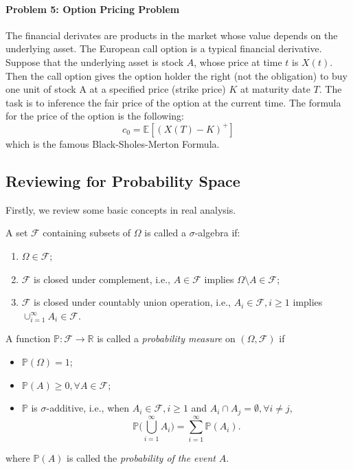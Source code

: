 
\paragraph{Problem 5: Option Pricing Problem}
The financial derivates are products in the market whose value depends on the underlying asset.
The European call option is a typical financial derivative.
Suppose that the underlying asset is stock $A$, whose price at time $t$ is $X(t)$.
Then the call option gives the option holder the right (not the obligation) to buy one unit of stock A at a specified price (strike price) $K$ at maturity date $T$.
The task is to inference the fair price of the option at the current time.
The formula for the price of the option is the following:
\[
c_0 = \mathbb{E}[
(X(T) - K)^+
]
\]
which is the famous Black-Sholes-Merton Formula.


\subsection{Reviewing for Probability Space}
Firstly, we review some basic concepts in real analysis.
\begin{definition}
A set $\mathcal{F}$ containing subsets of $\Omega$ is called a $\sigma$-algebra if:
\begin{enumerate}
\item
$\Omega\in\mathcal{F}$;
\item
$\mathcal{F}$ is closed under complement, i.e., 
$A\in\mathcal{F}$ implies $\Omega\setminus A\in\mathcal{F}$;
\item
$\mathcal{F}$ is closed under countably union operation, i.e.,
$A_i\in\mathcal{F},i\ge1$ implies $\cup_{i=1}^\infty A_i\in\mathcal{F}$.
\end{enumerate}
\end{definition}

\begin{definition}
A function $\mathbb{P}:\mathcal{F}\to\mathbb{R}$ is called a \emph{probability measure} on $(\Omega,\mathcal{F})$ if
\begin{itemize}
\item
$\mathbb{P}(\Omega)=1$;
\item
$\mathbb{P}(A)\ge0,\forall A\in\mathcal{F}$;
\item
$\mathbb{P}$ is $\sigma$-additive, i.e., when $A_i\in\mathcal{F},i\ge1$ and $A_i\cap A_j=\emptyset,\forall i\ne j$, 
\[
\mathbb{P}\bigg(
\bigcup_{i=1}^\infty A_i
\bigg)
=
\sum_{i=1}^\infty\mathbb{P}(A_i).
\]
\end{itemize}
where $\mathbb{P}(A)$ is called the \emph{probability of the event} $A$.
\end{definition}



